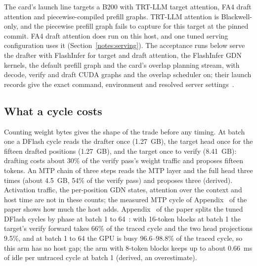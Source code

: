 The card's launch line targets a B200 with TRT-LLM target attention, FA4 draft attention and piecewise-compiled prefill graphs. TRT-LLM attention is Blackwell-only, and the piecewise prefill graph fails to capture for this target at the pinned commit. FA4 draft attention does run on this host, and one tuned serving configuration uses it (Section~\ref{notes:serving}). The acceptance runs below serve the drafter with FlashInfer for target and draft attention, the FlashInfer GDN kernels, the default prefill graph and the card's overlap planning stream, with decode, verify and draft CUDA graphs and the overlap scheduler on; their launch records give the exact command, environment and resolved server settings~.

\subsection{What a cycle costs}\label{app:drafter-cost}\label{sec:drafter-cost}
Counting weight bytes gives the shape of the trade before any timing. At batch one a DFlash cycle reads the drafter once (1.27~GB), the target head once for the fifteen drafted positions (1.27~GB), and the target once to verify (8.41~GB): drafting costs about 30\% of the verify pass's weight traffic and proposes fifteen tokens. An MTP chain of three steps reads the MTP layer and the full head three times (about 4.5~GB, 54\% of the verify pass) and proposes three (derived). Activation traffic, the per-position GDN states, attention over the context and host time are not in these counts; the measured MTP cycle of Appendix~ of the paper shows how much the host adds. Appendix~ of the paper splits the tuned DFlash cycles by phase at batch 1 to 64~: with 16-token blocks at batch 1 the target's verify forward takes 66\% of the traced cycle and the two head projections 9.5\%, and at batch 1 to 64 the GPU is busy 96.6--98.8\% of the traced cycle, so this arm has no host gap; the arm with 8-token blocks keeps up to about 0.66~ms of idle per untraced cycle at batch 1 (derived, an overestimate).

